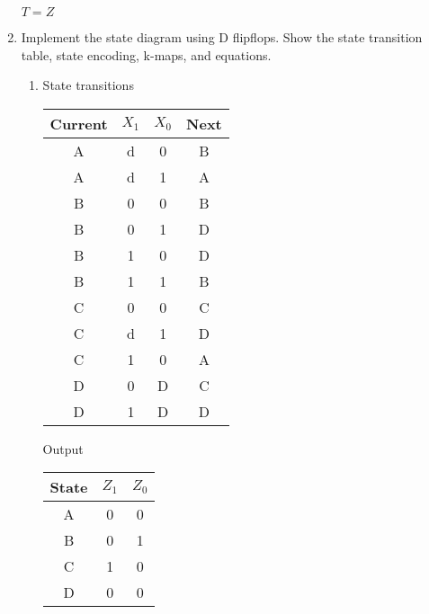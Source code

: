 \documentclass[12pt,letterpaper]{article}
\begin{document}
\begin{enumerate}

      $T = Z$

    \item
      Implement the state diagram using D flipflops.
      Show the state transition table, state encoding, k-maps, and equations.

      \begin{enumerate}
        \item
          State transitions

          \begin{tabular}{c | c c | c}
            Current & $X_1$ & $X_0$ & Next \\
            \hline
            A & d & 0 & B \\
            A & d & 1 & A \\
            B & 0 & 0 & B \\
            B & 0 & 1 & D \\
            B & 1 & 0 & D \\
            B & 1 & 1 & B \\
            C & 0 & 0 & C \\
            C & d & 1 & D \\
            C & 1 & 0 & A \\
            D & 0 & D & C \\
            D & 1 & D & D \\
          \end{tabular}

          Output

          \begin{tabular}{c | c c}
            State & $Z_1$ & $Z_0$ \\
            \hline
            A & 0 & 0 \\
            B & 0 & 1 \\
            C & 1 & 0 \\
            D & 0 & 0 \\
          \end{tabular}


\end{enumerate}
\end{enumerate}
\end{document}
